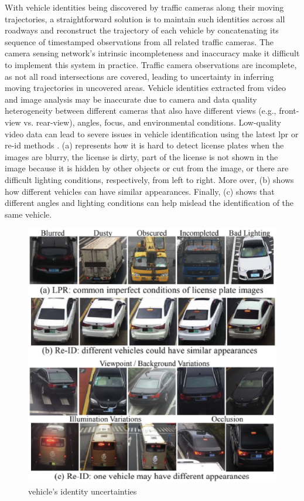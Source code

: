 With vehicle identities being discovered by traffic cameras along their moving trajectories, a straightforward solution is to maintain such identities across all roadways and reconstruct the trajectory of each vehicle by concatenating its sequence of timestamped observations from all related traffic cameras. 
The camera sensing network's intrinsic incompleteness and inaccuracy make it difficult to implement this system in practice.
Traffic camera observations are incomplete, as not all road intersections are covered, leading to uncertainty in inferring moving trajectories in uncovered areas.
Vehicle identities extracted from video and image analysis may be inaccurate due to camera and data quality heterogeneity between different cameras that also have different views (e.g., front-view vs. rear-view), angles, focus, and environmental conditions.
Low-quality video data can lead to severe issues in vehicle identification using the latest \ac{lpr} or \ac{re-id} methods \cite{zhou2018aware}.
(a) represents how it is hard to detect license plates when the images are blurry, the license is dirty, part of the license is not shown in the image because it is hidden by other objects or cut from the image, or there are difficult lighting conditions, respectively, from left to right.
More over, (b) shows how different vehicles can have similar appearances.
Finally, (c) shows that different angles and lighting conditions can help mislead the identification of the same vehicle.

\begin{figure}
\centering
  \includegraphics[width=0.9\linewidth]{figures/difficulty-in-identifying-vehicles.eps}
  \caption{vehicle's identity uncertainties \cite{tong2021large}}
  \label{fig:vehicle-identity-uncertainty}
\end{figure}


